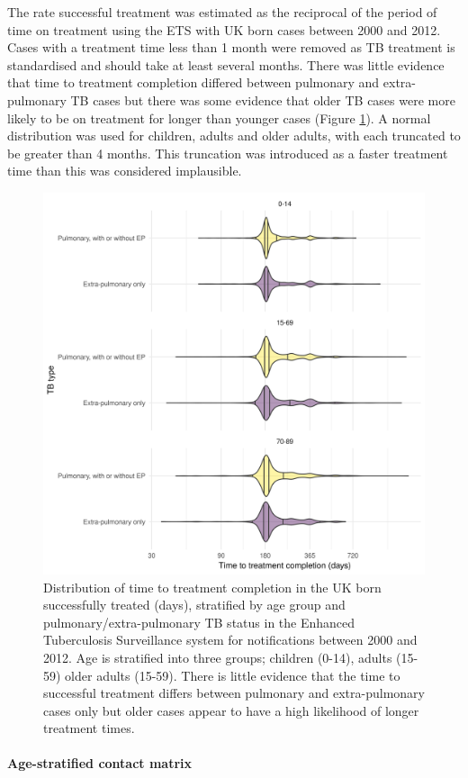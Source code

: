 \documentclass[11pt,twoside]{bristolthesis}
\begin{document}
  The rate successful treatment was estimated as the reciprocal of the period of time on treatment using the ETS with UK born cases between 2000 and 2012. Cases with a treatment time less than 1 month were removed as TB treatment is standardised and should take at least several months. There was little evidence that time to treatment completion differed between pulmonary and extra-pulmonary TB cases but there was some evidence that older TB cases were more likely to be on treatment for longer than younger cases (Figure \ref{fig:tb-treat-time-succ}). A normal distribution was used for children, adults and older adults, with each truncated to be greater than 4 months. This truncation was introduced as a faster treatment time than this was considered implausible.
  \begin{figure}
  
  {\centering \includegraphics[width=0.8\linewidth]{chapters/model-development/resources/figure/time_cure} 
  
  }
  
  \caption{Distribution of time to treatment completion in the UK born successfully treated (days), stratified by age group and pulmonary/extra-pulmonary TB status in the Enhanced Tuberculosis Surveillance system for notifications between 2000 and 2012. Age is stratified into three groups; children (0-14), adults (15-59) older adults (15-59). There is little evidence that the time to successful treatment differs between pulmonary and extra-pulmonary cases only but older cases appear to have a high likelihood of longer treatment times.}\label{fig:tb-treat-time-succ}
  \end{figure}
  \hypertarget{contact-matrix}{%
  \paragraph{Age-stratified contact matrix}\label{contact-matrix}}
  
\end{document}
